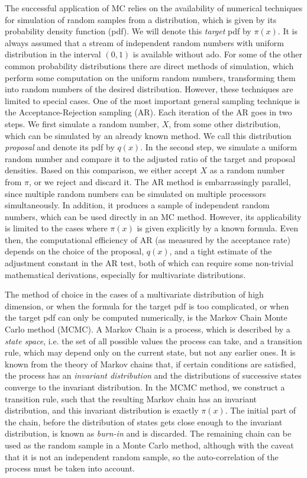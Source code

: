 \documentclass[11pt,letterpaper]{article}       %
\begin{document}
The successful application of MC relies on the availability of numerical
techniques for simulation of random samples from a distribution, which is given
by its probability density function (pdf).  We will denote this \emph{target}
pdf by $\pi(x)$.  It is always assumed that a stream of independent random
numbers with uniform distribution in the interval $(0,1)$ is available without
ado.  For some of the other common probability distributions there are direct
methods of simulation, which perform some computation on the uniform random
numbers, transforming them into random numbers of the desired distribution.
However, these techniques are limited to special cases.  One of the most
important general sampling technique is the Acceptance-Rejection sampling (AR).
Each iteration of the AR goes in two steps.  We first simulate a random number,
$X$, from some other distribution, which can be simulated by an already known
method.  We call this distribution \emph{proposal} and denote its pdf by
$q(x)$.  In the second step, we simulate a uniform random number and compare it
to the adjusted ratio of the target and proposal densities.  Based on this
comparison, we either accept $X$ as a random number from $\pi$, or we reject
and discard it.  The AR method is embarrassingly parallel, since multiple
random numbers can be simulated on multiple processors simultaneously.  In
addition, it produces a sample of independent random numbers, which can be used
directly in an MC method.  However, its applicability is limited to the cases
where $\pi(x)$ is given explicitly by a known formula.  Even then, the
computational efficiency of AR (as measured by the acceptance rate) depends on
the choice of the proposal, $q(x)$, and a tight estimate of the adjustment
constant in the AR test, both of which can require some non-trivial
mathematical derivations, especially for multivariate distributions.  

The method of choice in the cases of a multivariate distribution of high
dimension, or when the formula for the target pdf is too complicated, or when
the target pdf can only be computed numerically, is the Markov Chain Monte
Carlo method (MCMC).  A Markov Chain is a process, which is described by a
\emph{state space}, i.e. the set of all possible values the process can take,
and a transition rule, which may depend only on the current state, but not any
earlier ones. It is known from the theory of Markov chains that, if certain
conditions are satisfied, the process has an \emph{invariant distribution} and
the distributions of successive states converge to the invariant distribution.
In the MCMC method, we construct a transition rule, such that the resulting
Markov chain has an invariant distribution, and this invariant distribution is
exactly $\pi(x)$.  The initial part of the chain, before the distribution of
states gets close enough to the invariant distribution, is known as
\emph{burn-in} and is discarded.  The remaining chain can be used as the random
sample in a Monte Carlo method, although with the caveat that it is not an
independent random sample, so the auto-correlation of the process must be taken
into account.  
\end{document}
